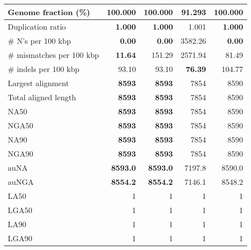 \documentclass[12pt,a4paper]{article}
\begin{document}
\begin{table}[ht]
\begin{center}
\begin{tabular}{|l*{4}{|r}|}
Genome fraction (\%) & {\bf 100.000} & {\bf 100.000} & 91.293 & {\bf 100.000} \\ \hline
Duplication ratio & {\bf 1.000} & {\bf 1.000} & 1.001 & {\bf 1.000} \\ \hline
\# N's per 100 kbp & {\bf 0.00} & {\bf 0.00} & 3582.26 & {\bf 0.00} \\ \hline
\# mismatches per 100 kbp & {\bf 11.64} & 151.29 & 2571.94 & 81.49 \\ \hline
\# indels per 100 kbp & 93.10 & 93.10 & {\bf 76.39} & 104.77 \\ \hline
Largest alignment & {\bf 8593} & {\bf 8593} & 7854 & 8590 \\ \hline
Total aligned length & {\bf 8593} & {\bf 8593} & 7854 & 8590 \\ \hline
NA50 & {\bf 8593} & {\bf 8593} & 7854 & 8590 \\ \hline
NGA50 & {\bf 8593} & {\bf 8593} & 7854 & 8590 \\ \hline
NA90 & {\bf 8593} & {\bf 8593} & 7854 & 8590 \\ \hline
NGA90 & {\bf 8593} & {\bf 8593} & 7854 & 8590 \\ \hline
auNA & {\bf 8593.0} & {\bf 8593.0} & 7197.8 & 8590.0 \\ \hline
auNGA & {\bf 8554.2} & {\bf 8554.2} & 7146.1 & 8548.2 \\ \hline
LA50 & 1 & 1 & 1 & 1 \\ \hline
LGA50 & 1 & 1 & 1 & 1 \\ \hline
LA90 & 1 & 1 & 1 & 1 \\ \hline
LGA90 & 1 & 1 & 1 & 1 \\ \hline
\end{tabular}
\end{center}
\end{table}
\end{document}
